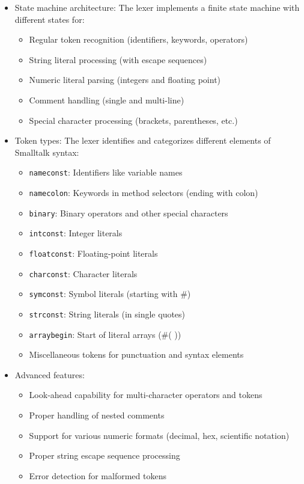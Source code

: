 \documentclass[12pt,a4paper]{report}
\begin{document}
\begin{itemize}
    \item State machine architecture: The lexer implements a finite state machine with different states for:
    \begin{itemize}
        \item Regular token recognition (identifiers, keywords, operators)
        \item String literal processing (with escape sequences)
        \item Numeric literal parsing (integers and floating point)
        \item Comment handling (single and multi-line)
        \item Special character processing (brackets, parentheses, etc.)
    \end{itemize}

    \item Token types: The lexer identifies and categorizes different elements of Smalltalk syntax:
    \begin{itemize}
        \item \texttt{nameconst}: Identifiers like variable names
        \item \texttt{namecolon}: Keywords in method selectors (ending with colon)
        \item \texttt{binary}: Binary operators and other special characters
        \item \texttt{intconst}: Integer literals
        \item \texttt{floatconst}: Floating-point literals
        \item \texttt{charconst}: Character literals
        \item \texttt{symconst}: Symbol literals (starting with \#)
        \item \texttt{strconst}: String literals (in single quotes)
        \item \texttt{arraybegin}: Start of literal arrays (\#( ))
        \item Miscellaneous tokens for punctuation and syntax elements
    \end{itemize}

    \item Advanced features:
    \begin{itemize}
        \item Look-ahead capability for multi-character operators and tokens
        \item Proper handling of nested comments
        \item Support for various numeric formats (decimal, hex, scientific notation)
        \item Proper string escape sequence processing
        \item Error detection for malformed tokens
    \end{itemize}


\end{itemize}
\end{document}
